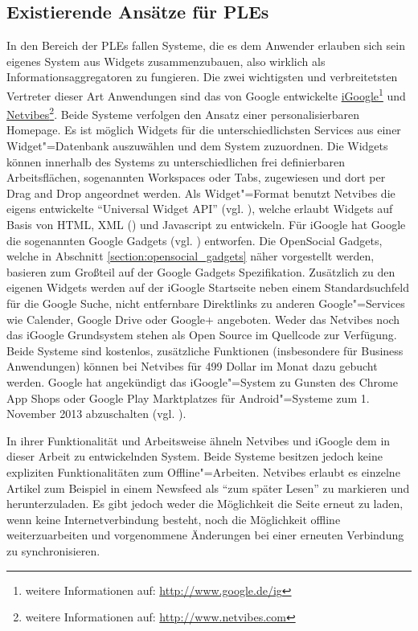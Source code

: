 \subsection{Existierende Ansätze für \acsp{PLE}}
In den Bereich der \acp{PLE} fallen Systeme, die es dem Anwender erlauben sich sein eigenes System aus Widgets zusammenzubauen, also wirklich als Informationsaggregatoren zu fungieren. Die zwei wichtigsten und verbreitetsten Vertreter dieser Art Anwendungen sind das von Google entwickelte \href{http://www.google.de/ig}{iGoogle}\footnote{weitere Informationen auf: \url{http://www.google.de/ig}} und \href{http://www.netvibes.com}{Netvibes}\footnote{weitere Informationen auf: \url{http://www.netvibes.com}}. Beide Systeme verfolgen den Ansatz einer personalisierbaren Homepage. Es ist möglich Widgets für die unterschiedlichsten Services aus einer Widget"=Datenbank auszuwählen und dem System zuzuordnen. Die Widgets können innerhalb des Systems zu unterschiedlichen frei definierbaren Arbeitsflächen, sogenannten Workspaces oder Tabs, zugewiesen und dort per Drag and Drop angeordnet werden. Als Widget"=Format benutzt Netvibes die eigens entwickelte "`Universal Widget API"' (vgl. \cite{UWAJSRuntime2012}), welche erlaubt Widgets auf Basis von \ac{HTML}, \acs{XML} () und Javascript zu entwickeln. Für iGoogle hat Google die sogenannten Google Gadgets (vgl. \cite{GoogleGadgetsApi2012}) entworfen. Die OpenSocial Gadgets, welche in Abschnitt \ref{section:opensocial_gadgets} näher vorgestellt werden, basieren zum Großteil auf der Google Gadgets Spezifikation. Zusätzlich zu den eigenen Widgets werden auf der iGoogle Startseite neben einem Standardsuchfeld für die Google Suche, nicht entfernbare Direktlinks zu anderen Google"=Services wie Calender, Google Drive oder Google+ angeboten. Weder das Netvibes noch das iGoogle Grundsystem stehen als Open Source im Quellcode zur Verfügung. Beide Systeme sind kostenlos, zusätzliche Funktionen (insbesondere für Business Anwendungen) können bei Netvibes für 499 Dollar im Monat dazu gebucht werden. Google hat angekündigt das iGoogle"=System zu Gunsten des Chrome App Shops oder Google Play Marktplatzes für Android"=Systeme zum 1. November 2013 abzuschalten (vgl. \cite{Google2012}).

In ihrer Funktionalität und Arbeitsweise ähneln Netvibes und iGoogle dem in dieser Arbeit zu entwickelnden System. Beide Systeme besitzen jedoch keine expliziten Funktionalitäten zum Offline"=Arbeiten. Netvibes erlaubt es einzelne Artikel zum Beispiel in einem Newsfeed als "`zum später Lesen"' zu markieren und herunterzuladen. Es gibt jedoch weder die Möglichkeit die Seite erneut zu laden, wenn keine Internetverbindung besteht, noch die Möglichkeit offline weiterzuarbeiten und vorgenommene Änderungen bei einer erneuten Verbindung zu synchronisieren. 

